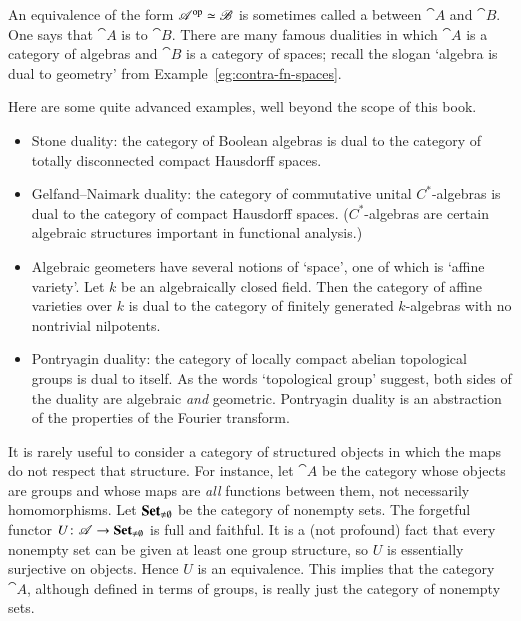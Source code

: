 \begin{example}
An equivalence of the form $\mathscr{A}^{\mathrm{op}} \simeq \mathscr{B}$ is sometimes called a
%
%
%
between $\cat{A}$ and $\cat{B}$.  One says that $\cat{A}$ is 
to $\cat{B}$.  There are many famous dualities in which $\cat{A}$ is a
category of algebras and $\cat{B}$ is a category of spaces; recall the
slogan `algebra is dual%
%
%
to geometry' from Example~\ref{eg:contra-fn-spaces}.

Here are some quite advanced examples, well beyond the scope of this book.
%
\begin{itemize}
\item
Stone duality:%
%
%
the category of Boolean%
%
%
algebras is dual to the category of totally disconnected compact Hausdorff
spaces.

\item
Gelfand--Naimark duality:%
%
%
the category of commutative unital $C^*$-algebras%
%
%
is dual to the category of compact Hausdorff spaces.  ($C^*$-algebras are
certain algebraic structures important in functional analysis.)

\item
Algebraic geometers%
%
%
have several notions of `space', one of which is `affine variety'.%
%
%
Let $k$ be an algebraically closed field.  Then the category of affine
varieties over $k$ is dual to the category of finitely generated
$k$-algebras with no nontrivial nilpotents.

\item
Pontryagin duality:%
%
%
the category of locally compact abelian topological%
%
%
\linebreak
%
groups is dual to itself.  As the words `topological group' suggest, both
sides of the duality are algebraic \emph{and} geometric.  Pontryagin
duality is an abstraction of the properties of the Fourier%
%
%
transform.
\end{itemize}
\end{example}


\begin{example}
It is rarely useful to consider a category of structured objects in
which the maps do not respect that structure.  For instance, let $\cat{A}$
be the category whose objects are groups%
%
%
and whose maps are \emph{all} functions between them, not necessarily
homomorphisms.  Let $\mathbf{Set}_{\neq\emptyset}$ be the category of nonempty
sets.  The forgetful functor $U\from \cat{A} \to \Set_{\neq\emptyset}$ is
full and faithful.  It is a (not profound) fact that every nonempty set can
be given at least one group structure, so $U$ is essentially surjective on
objects.  Hence $U$ is an equivalence.  This implies that the category
$\cat{A}$, although defined in terms of groups, is really just the category
of nonempty sets.
\end{example}

